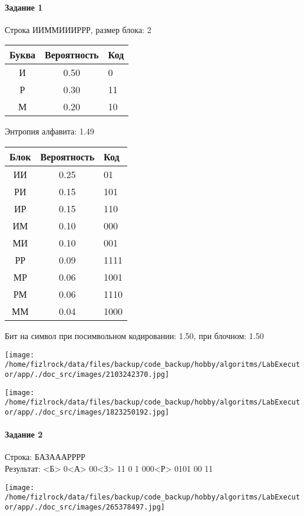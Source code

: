 \documentclass[a4paper, 12pt]{article}
\begin{document}
\paragraph{Задание 1}

Строка ИИММИИИРРР, размер блока: 2
\begin{center}
 \begin{tabular}{ |c|c|l| } 
  \hline
     Буква & Вероятность & Код\\ \hline
И & 0.50 & 0\\\hline
Р & 0.30 & 11\\\hline
М & 0.20 & 10
\\ \hline \end{tabular}
\end{center}
Энтропия алфавита: 1.49
\begin{center}
 \begin{tabular}{ |c|c|l| } 
  \hline
     Блок & Вероятность & Код\\ \hline
ИИ & 0.25 & 01\\\hline
РИ & 0.15 & 101\\\hline
ИР & 0.15 & 110\\\hline
ИМ & 0.10 & 000\\\hline
МИ & 0.10 & 001\\\hline
РР & 0.09 & 1111\\\hline
МР & 0.06 & 1001\\\hline
РМ & 0.06 & 1110\\\hline
ММ & 0.04 & 1000
\\ \hline \end{tabular}
\end{center}
Бит на символ при посимвольном кодировании: 1.50, при блочном: 1.50

\texttt{[image: /home/fizlrock/data/files/backup/code\_backup/hobby/algoritms/LabExecutor/app/./doc\_src/images/2103242370.jpg]}

\texttt{[image: /home/fizlrock/data/files/backup/code\_backup/hobby/algoritms/LabExecutor/app/./doc\_src/images/1823250192.jpg]}
\pagebreak
\paragraph{Задание 2}

Строка: 
БАЗАААРРРР\\
Результат: <Б> 0<А> 00<З> 11 0 1 000<Р> 0101 00 11

\texttt{[image: /home/fizlrock/data/files/backup/code\_backup/hobby/algoritms/LabExecutor/app/./doc\_src/images/265378497.jpg]}
\end{document}
